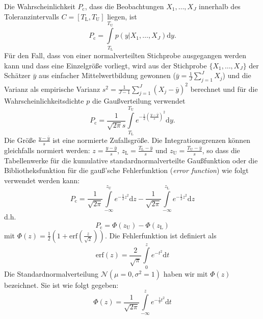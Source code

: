 Die Wahrscheinlichkeit $P_\mathrm{c}$, dass die Beobachtungen ${X_1,\dots,X_J}$ innerhalb des Toleranzintervalls
$C = [T_\mathrm{L}, T_\mathrm{U}]$ liegen, ist
\begin{equation}
	P_\mathrm{c} =  \int\limits_{T_\mathrm{L}}^{T_\mathrm{U}} p(y|{X_1,\dots,X_J}) \mathrm{d}y.
\end{equation}
Für den Fall, dass von einer normalverteilten Stichprobe ausgegangen werden kann und dass eine Einzelgröße
vorliegt, wird aus der Stichprobe $\{X_1,\dots,X_J\}$ der Schätzer $\bar y$ aus einfacher Mittelwertbildung
gewonnen ($\bar y = \frac{1}{J} \sum\limits_{j=1}^J X_j$) und die Varianz als empirische Varianz
$s^2 = \frac{1}{J-1}\sum\limits_{j=1}^J (X_j - \bar y)^2$ berechnet
und für die Wahrscheinlichkeitsdichte $p$ die Gaußverteilung verwendet
\begin{equation}
	P_\mathrm{c} = \frac{1}{\sqrt{2 \pi} s} \int\limits_{T_\mathrm{L}}^{T_\mathrm{U}}
	e^{-\frac{1}{2}\left(\frac{y - \bar y}{s}\right)^2} \mathrm{d}y .
		\label{eq:Konformitaetswahrscheinlichkeit}
\end{equation}
Die Größe $\frac{y - \bar y}{s}$ ist eine normierte Zufallsgröße. Die Integrationsgrenzen können gleichfalls
normiert werden: $z = \frac{y - \bar y}{s}$, $z_\mathrm{L} = \frac{T_\mathrm{L} - \bar y}{s}$ und
$z_\mathrm{U} = \frac{T_\mathrm{U} - \bar y}{s}$, so dass die Tabellenwerke für die kumulative
standardnormalverteilte Gaußfunktion oder die Bibliotheksfunktion
für die gauß'sche Fehlerfunktion (\textsl{error function}) wie folgt verwendet werden kann:
\begin{equation}
	P_\mathrm{c} = \frac{1}{\sqrt{2 \pi}} \int\limits_{-\infty}^{z_\mathrm{U}}
	e^{-\frac{1}{2} z^2} \mathrm{d}z -
	\frac{1}{\sqrt{2 \pi}} \int\limits_{-\infty}^{z_\mathrm{L}} e^{-\frac{1}{2} z^2} \mathrm{d}z
\end{equation}
d.h.
\begin{equation}
	P_\mathrm{c} = \Phi(z_\mathrm{U}) - \Phi(z_\mathrm{L})
\end{equation}
mit $\Phi(z) = \frac{1}{2} \left(1 + \mathrm{erf}\left(\frac{z}{\sqrt{2}}\right) \right)$. Die Fehlerfunktion ist definiert als
\begin{equation}
	\mathrm{erf}(z)= \frac{2}{\sqrt{\pi}}\int\limits_{0}^{z} e^{-t^2}\mathrm{d}t
\end{equation}
Die Standardnormalverteilung $\mathcal{N}(\mu=0,\sigma^2=1)$ haben wir mit $\Phi(z)$ bezeichnet. Sie ist wie folgt gegeben:
\begin{equation}
	\Phi(z)= \frac{1}{\sqrt{2\pi}}\int\limits_{-\infty}^{z} e^{- \frac{1}{2} t^2}\mathrm{d}t
\end{equation}
